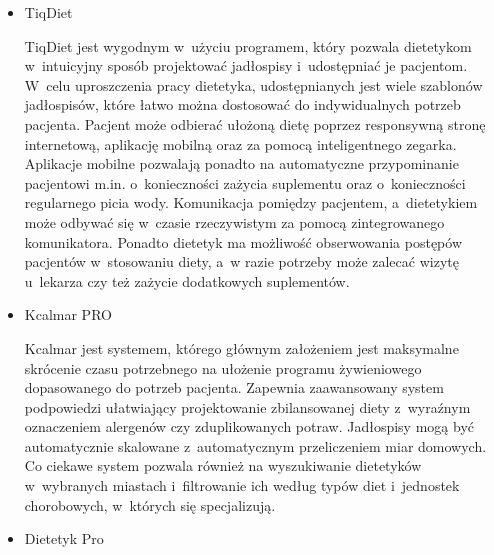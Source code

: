 \begin{itemize}
    \item TiqDiet

        TiqDiet\cite{url:TiqDiet} jest wygodnym w~użyciu programem, który pozwala dietetykom w~intuicyjny sposób projektować jadłospisy i~udostępniać je pacjentom.
        W~celu uproszczenia pracy dietetyka, udostępnianych jest wiele szablonów jadłospisów, które łatwo można dostosować do indywidualnych potrzeb pacjenta.
        Pacjent może odbierać ułożoną dietę poprzez responsywną stronę internetową, aplikację mobilną oraz za pomocą inteligentnego zegarka.
        Aplikacje mobilne pozwalają ponadto na automatyczne przypominanie pacjentowi m.in. o~konieczności zażycia suplementu oraz o~konieczności regularnego picia wody.
        Komunikacja pomiędzy pacjentem, a~dietetykiem może odbywać się w~czasie rzeczywistym za pomocą zintegrowanego komunikatora.
        Ponadto dietetyk ma możliwość obserwowania postępów pacjentów w~stosowaniu diety, a~w razie potrzeby może zalecać wizytę u~lekarza czy też zażycie dodatkowych suplementów.
%
    \item Kcalmar PRO

        Kcalmar\cite{url:kcalmar} jest systemem, którego głównym założeniem jest maksymalne skrócenie czasu potrzebnego na ułożenie programu żywieniowego dopasowanego do potrzeb pacjenta.
        Zapewnia zaawansowany system podpowiedzi ułatwiający projektowanie zbilansowanej diety z~wyraźnym oznaczeniem alergenów czy zduplikowanych potraw.
        Jadłospisy mogą być automatycznie skalowane z~automatycznym przeliczeniem miar domowych.
        Co ciekawe system pozwala również na wyszukiwanie dietetyków w~wybranych miastach i~filtrowanie ich według typów diet i~jednostek chorobowych, w~których się specjalizują.
%
    \item Dietetyk Pro


\end{itemize}
